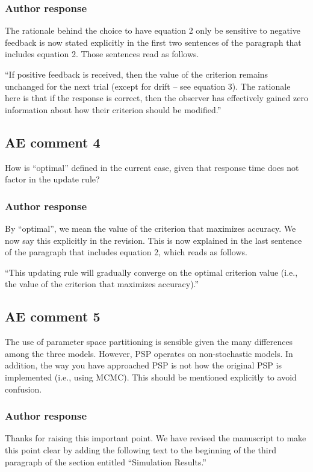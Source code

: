 \documentclass[12pt]{article}
\begin{document}
\subsubsection{Author response}
The rationale behind the choice to have equation 2 only be
sensitive to negative feedback is now stated explicitly in
the first two sentences of the paragraph that includes
equation 2. Those sentences read as follows.

``If positive feedback is received, then the value of the
criterion remains unchanged for the next trial (except for
drift – see equation 3). The rationale here is that if the
response is correct, then the observer has effectively
gained zero information about how their criterion should be
modified.''

\subsection{AE comment 4}
How is ``optimal'' defined in the current case, given that
response time does not factor in the update rule?

\subsubsection{Author response}
By ``optimal'', we mean the value of the criterion that
maximizes accuracy. We now say this explicitly in the
revision. This is now explained in the last sentence of the
paragraph that includes equation 2, which reads as follows.

``This updating rule will gradually converge on the optimal
criterion value (i.e., the value of the criterion that
maximizes accuracy).''

\subsection{AE comment 5}
The use of parameter space partitioning is sensible given
the many differences among the three models. However, PSP
operates on non-stochastic models. In addition, the way you
have approached PSP is not how the original PSP is
implemented (i.e., using MCMC). This should be mentioned
explicitly to avoid confusion.

\subsubsection{Author response}
Thanks for raising this important point. We have revised the
manuscript to make this point clear by adding the following
text  to the beginning of the third paragraph of the section
entitled ``Simulation Results.''
\end{document}
